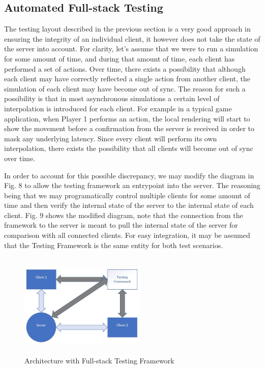 \documentclass[conference]{IEEEtran}
\begin{document}
\subsection{Automated Full-stack Testing}

The testing layout described in the previous section is a very good approach in ensuring the integrity of an individual client, it however does not take the state of the server into account.
For clarity, let's assume that we were to run a simulation for some amount of time, and during that amount of time, each client has performed a set of actions. Over time, there exists a possibility that 
although each client may have correctly reflected a single action from another client, the simulation of each client may have become out of sync. The reason for such a possibility is that in most 
asynchronous simulations a certain level of interpolation is introduced for each client. For example in a typical game application, when Player 1 performs an action, the local
rendering will start to show the movement before a confirmation from the server is received in order to mask any underlying latency. Since every client will perform its own interpolation, 
there exists the possibility that all clients will become out of sync over time. 

In order to account for this possible discrepancy, we may modify the diagram in Fig. 8 to allow the testing framework an entrypoint into the server. The reasoning being that we may programatically
control multiple clients for some amount of time and then verify the internal state of the server to the internal state of each client. Fig. 9 shows the modified diagram, note that the connection
from the framework to the server is meant to pull the internal state of the server for comparison with all connected clients. For easy integration, it may be assumed that the Testing Framework
is the same entity for both test scenarios.

\begin{figure}[htbp]
\centerline{\includegraphics [width = 6cm, height = 5cm] {images/FullStackTestingDiagram.jpg}}
\caption{Architecture with Full-stack Testing Framework}
\end{figure}
\end{document}
